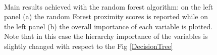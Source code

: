 \documentclass[
12pt, %
a4paper, %
oneside, %
headinclude,footinclude, %
BCOR5mm, %
]{scrartcl}
\begin{document}
\begin{figure}[h]
  \centering
{}\\
\caption{Main results achieved with the random forest algorithm: on the left panel (a) the random Forest proximity scores is reported while on the left panel (b) the overall importance of each variable is plotted. Note that in this case the hierarchy importance of the variables is slightly changed with respect to the Fig \ref{DecisionTree} }
\label{Random_forest_tree_results}
\end{figure}
\end{document}
